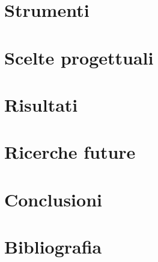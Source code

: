 \documentclass[a4paper]{article}
\begin{document}
\section{Strumenti}

\section{Scelte progettuali}

\section{Risultati}

\section{Ricerche future}

\section{Conclusioni}

\section{Bibliografia}
\end{document}

